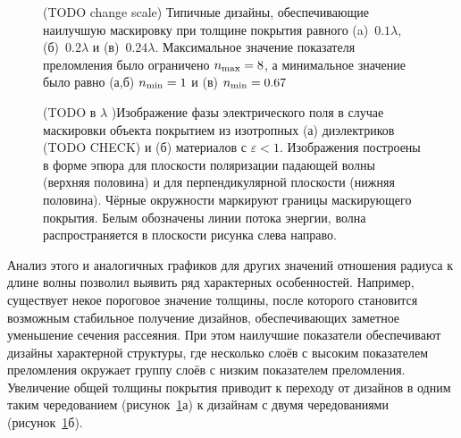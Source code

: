 \begin{figure}[p]
  \begin{minipage}[ht]{0.32\linewidth}
  \end{minipage}
  \hfill
  \begin{minipage}[ht]{0.32\linewidth}
  \end{minipage}
  \hfill
  \begin{minipage}[ht]{0.32\linewidth}
  \end{minipage}
  \caption{(TODO change scale) Типичные дизайны, обеспечивающие наилучшую маскировку при
    толщине покрытия равного (a)~$0.1\lambda$, (б)~$0.2\lambda$ и
    (в)~$0.24\lambda$. Максимальное значение показателя преломления
    было ограничено $n_{\rm max}=8$, а минимальное значение было равно
  (а,б) $n_{\rm min}=1$ и (в) $n_{\rm min}=0.67$}
  \label{img:designs}  
\end{figure}
\begin{figure}[p]
  \begin{minipage}[ht]{0.495\linewidth}
  \end{minipage}
  \hfill
  \begin{minipage}[ht]{0.495\linewidth}
  \end{minipage}
  \caption{(TODO в $\lambda$ )Изображение фазы электрического поля в
    случае маскировки объекта покрытием из изотропных (а) диэлектриков
    (TODO CHECK)
    и (б) материалов с ${\varepsilon <1}$. Изображения построены в
    форме эпюра для плоскости поляризации падающей волны (верхняя
    половина) и для перпендикулярной плоскости (нижняя
    половина). Чёрные окружности маркируют границы маскирующего
    покрытия. Белым обозначены линии потока энергии, волна
    распространяется в плоскости рисунка слева направо.}
  \label{img:field-phase}  
\end{figure}

Анализ этого и аналогичных графиков для других значений отношения
радиуса к длине волны позволил выявить ряд характерных
особенностей. Например, существует некое пороговое значение толщины,
после которого становится возможным стабильное получение дизайнов,
обеспечивающих заметное уменьшение сечения рассеяния. При этом
наилучшие показатели обеспечивают дизайны характерной структуры, где
несколько слоёв с высоким показателем преломления окружает группу
слоёв с низким показателем преломления. Увеличение общей толщины
покрытия приводит к переходу от дизайнов в одним таким чередованием
(рисунок~\ref{img:designs}а) к дизайнам с двумя чередованиями
(рисунок~\ref{img:designs}б).



